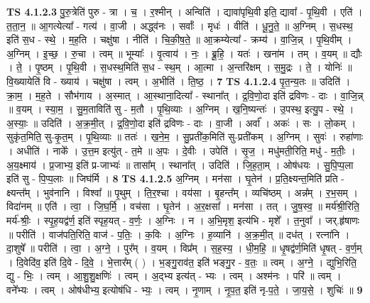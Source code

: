 \documentclass[17pt]{extarticle}
\begin{document}
                  \newline
                                \textbf{ TS 4.1.2.3} \newline
                  पु॒रु॒त्रेति॑ पुरु - त्रा । च॒ । र॒श्मीन् । अन्विति॑ । द्यावा॑पृथि॒वी इति॒ द्यावा᳚ - पृ॒थि॒वी । एति॑ । त॒ता॒न॒ ॥ आ॒गत्येत्या᳚ - गत्य॑ । वा॒जी । अद्ध्व॑नः । सर्वाः᳚ । मृधः॑ । वीति॑ । धू॒नु॒ते॒ ॥ अ॒ग्निम् । स॒धस्थ॒ इति॑ स॒ध - स्थे॒ । म॒ह॒ति । चक्षु॑षा । नीति॑ । चि॒की॒ष॒ते॒ ॥ आ॒क्रम्येत्या᳚ - क्रम्य॑ । वा॒जि॒न्न् । पृ॒थि॒वीम् । अ॒ग्निम् । इ॒च्छ॒ । रु॒चा । त्वम् ॥ भूम्याः᳚ । वृ॒त्वाय॑ । नः॒ । ब्रू॒हि॒ । यतः॑ । खना॑म । तम् । व॒यम् ॥ द्यौः । ते॒ । पृ॒ष्ठम् । पृ॒थि॒वी । स॒धस्थ॒मिति॑ स॒ध - स्थ॒म् । आ॒त्मा । अ॒न्तरि॑क्षम् । स॒मु॒द्रः । ते॒ । योनिः॑ ॥ वि॒ख्यायेति॑ वि - ख्याय॑ । चक्षु॑षा । त्वम् । अ॒भीति॑ । ति॒ष्ठ॒ । \textbf{  7} \newline
                  \newline
                                \textbf{ TS 4.1.2.4} \newline
                  पृ॒त॒न्य॒तः ॥ उदिति॑ । क्रा॒म॒ । म॒ह॒ते । सौभ॑गाय । अ॒स्मात् । आ॒स्थाना॒दित्या᳚ - स्थाना᳚त् । द्र॒वि॒णो॒दा इति॑ द्रविणः - दाः । वा॒जि॒न्न् ॥ व॒यम् । स्या॒म॒ । सु॒म॒ताविति॑ सु - म॒तौ । पृ॒थि॒व्याः । अ॒ग्निम् । ख॒नि॒ष्यन्तः॑ । उ॒पस्थ॒ इत्यु॒प - स्थे॒ । अ॒स्याः॒ ॥ उदिति॑ । अ॒क्र॒मी॒त् । द्र॒वि॒णो॒दा इति॑ द्रविणः - दाः । वा॒जी । अर्वा᳚ । अकः॑ । सः । लो॒कम् । सुकृ॑त॒मिति॒ सु-कृ॒त॒म् । पृ॒थि॒व्याः ॥ ततः॑ । ख॒ने॒म॒ । सु॒प्रती॑क॒मिति॑ सु-प्रती॑कम् । अ॒ग्निम् । सुवः॑ । रुहा॑णाः । अधीति॑ । नाके᳚ । उ॒त्त॒म इत्यु॑त् - त॒मे ॥ अ॒पः । दे॒वीः । उपेति॑ । सृ॒ज॒ । मधु॑मती॒रिति॒ मधु॑ - म॒तीः॒ । अ॒य॒क्ष्माय॑ । प्र॒जाभ्य॒ इति॑ प्र-जाभ्यः॑ ॥ तासा᳚म् । स्थाना᳚त् । उदिति॑ । जि॒ह॒ता॒म् । ओष॑धयः । सु॒पि॒प्प॒ला इति॑ सु - पि॒प्प॒लाः ॥ जिघ॑र्मि । \textbf{  8} \newline
                  \newline
                                \textbf{ TS 4.1.2.5} \newline
                  अ॒ग्निम् । मन॑सा । घृ॒तेन॑ । प्र॒ति॒क्ष्यन्त॒मिति॑ प्रति - क्ष्यन्त᳚म् । भुव॑नानि । विश्वा᳚ ॥ पृ॒थुम् । ति॒र॒श्चा । वय॑सा । बृ॒हन्त᳚म् । व्यचि॑ष्ठम् । अन्न᳚म् । र॒भ॒सम् । विदा॑नम् ॥ एति॑ । त्वा॒ । जि॒घ॒र्मि॒ । वच॑सा । घृ॒तेन॑ । अ॒र॒क्षसा᳚ । मन॑सा । तत् । जु॒ष॒स्व॒ ॥ मर्य॑श्री॒रिति॒ मर्य॑-श्रीः॒ । स्पृ॒ह॒यद्व॑र्ण॒ इति॑ स्पृह॒यत् - व॒र्णः॒ । अ॒ग्निः । न । अ॒भि॒मृश॒ इत्य॑भि - मृशे᳚ । त॒नुवा᳚ । जर्.हृ॑षाणः ॥ परीति॑ । वाज॑पति॒रिति॒ वाज॑ - प॒तिः॒ । क॒विः । अ॒ग्निः । ह॒व्यानि॑ । अ॒क्र॒मी॒त् ॥ दध॑त् । रत्ना॑नि । दा॒शुषे᳚ ॥ परीति॑ । त्वा॒ । अ॒ग्ने॒ । पुर᳚म् । व॒यम् । विप्र᳚म् । स॒ह॒स्य॒ । धी॒म॒हि॒ ॥ धृ॒षद्व॑र्ण॒मिति॑ धृ॒षत् - व॒र्ण॒म् । दि॒वेदि॑व॒ इति॑ दि॒वे - दि॒वे॒ । भे॒त्तार᳚म् ( ) । भ॒ङ्गु॒राव॑त॒ इति॑ भङ्गु॒र - व॒तः॒ ॥ त्वम् । अ॒ग्ने॒ । द्युभि॒रिति॒ द्यु - भिः॒ । त्वम् । आ॒शु॒शु॒क्षणिः॑ । त्वम् । अ॒द्भ्य इत्य॑त् - भ्यः । त्वम् । अश्म॑नः । परि॑ ॥ त्वम् । वने᳚भ्यः । त्वम् । ओष॑धीभ्य॒ इत्योष॑धि - भ्यः॒ । त्वम् । नृ॒णाम् । नृ॒प॒त॒ इति॑ नृ-प॒ते॒ । जा॒य॒से॒ । शुचिः॑ ॥ \textbf{  9 } \newline
\end{document}
